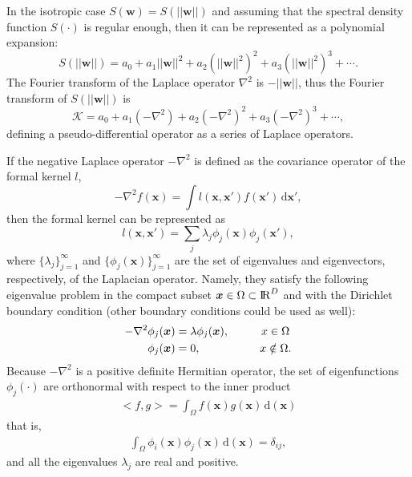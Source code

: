 \documentclass[onecolumn,a4paper,11pt]{article}
\begin{document}
In the isotropic case $S(\bm{w}) = S(||\bm{w}||)$ and assuming that the spectral density function $S(\cdot)$ is regular enough, then it can be represented as a polynomial expansion:
%
\begin{equation}\label{ch5_eq_S}
S(||\bm{w}||)=a_0+a_1||\bm{w}||^2+a_2(||\bm{w}||^2)^2+a_3(||\bm{w}||^2)^3+\cdots.
\end{equation}
The Fourier transform of the Laplace operator $\nabla^2$ is $-||\bm{w}||$, thus the Fourier transform of $S(||\bm{w}||)$ is
%
\begin{equation}\label{ch5_eq_K}
\mathcal{K}=a_0+a_1(-\nabla^2)+a_2(-\nabla^2)^2+a_3(-\nabla^2)^3+\cdots,
\end{equation}
defining a pseudo-differential operator as a series of Laplace operators.

If the negative Laplace operator $-\nabla^2$ is defined as the covariance operator of the formal kernel $l$,
%
\begin{equation*}
-\nabla^2 f(\bm{x}) = \int l(\bm{x},\bm{x}') f(\bm{x}') \,\mathrm{d}\bm{x}',
\end{equation*} 
then the formal kernel can be represented as 
%
\begin{equation*}
l(\bm{x},\bm{x}')= \sum_j \lambda_j \phi_j(\bm{x}) \phi_j(\bm{x}'),
\end{equation*}
where $\{\lambda_j\}_{j=1}^{\infty}$ and $\{\phi_j(\bm{x})\}_{j=1}^{\infty}$ are the set of eigenvalues and eigenvectors, respectively, of the Laplacian operator. Namely, they satisfy the following eigenvalue problem in the compact subset $\bm{x} \in \Omega \subset {\rm I\!R}^D$ and with the Dirichlet boundary condition (other boundary conditions could be used as well):
%
\begin{align*}
-\nabla^2 \phi_j(\bm{x})&=\lambda \phi_j(\bm{x}), \hspace{1cm}  x\in \Omega \nonumber \\ 
\phi_j(\bm{x})&=0, \hspace{1.85cm} x\notin \Omega.
\end{align*}  
Because $-\nabla^2$ is a positive definite Hermitian operator, the set of eigenfunctions $\phi_j(\cdot)$ are orthonormal with respect to the inner product
%
\begin{align*}
<f,g>=\int_\Omega f(\bm{x}) g(\bm{x}) \,\mathrm{d}(\bm{x})
\end{align*} 
that is,
%
\begin{align*}
\int_\Omega \phi_i(\bm{x}) \phi_j(\bm{x}) \,\mathrm{d}(\bm{x}) = \delta_{ij},
\end{align*} 
and all the eigenvalues $\lambda_j$ are real and positive. 
\end{document}
